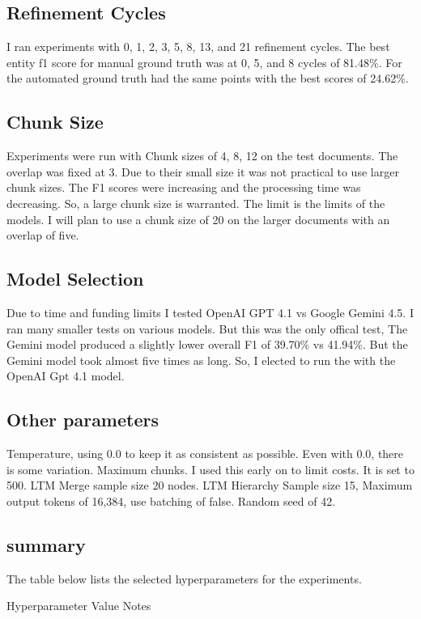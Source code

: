 \subsection{Refinement Cycles}
I ran experiments with 0, 1, 2, 3, 5, 8, 13, and 21 refinement cycles. The best entity f1 score for manual ground truth was at 0, 5, and 8 cycles of 81.48\%. For the automated ground truth had the same points with the best scores of 24.62\%.

\subsection{Chunk Size}
Experiments were run with Chunk sizes of 4, 8, 12 on the test documents. The overlap was fixed at 3. Due to their small size it was not practical to use larger chunk sizes. The F1 scores were increasing and the processing time was decreasing. So, a large chunk size is warranted. The limit is the limits of the models. I will plan to use a chunk size of 20 on the larger documents with an overlap of five.

\subsection{Model Selection}
Due to time and funding limits I tested OpenAI GPT 4.1 vs Google Gemini 4.5. I ran many smaller tests on various models. But this was the only offical test, The Gemini model produced a slightly lower overall F1 of 39.70\% vs 41.94\%. But the Gemini model took almost five times as long. So, I elected to run the with the OpenAI Gpt 4.1 model.

\subsection{Other parameters}
Temperature, using 0.0 to keep it as consistent as possible. Even with 0.0, there is some variation. Maximum chunks. I used this early on to limit costs. It is set to 500. LTM Merge sample size 20 nodes. LTM Hierarchy Sample size 15, Maximum output tokens of 16,384, use batching of false. Random seed of 42.

\subsection{summary}

The table below lists the selected hyperparameters for the experiments.

Hyperparameter  Value   Notes


